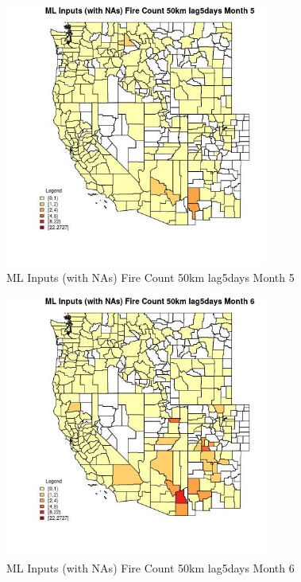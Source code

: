 \begin{figure} 
\centering  
\includegraphics[width=0.77\textwidth]{Code_Outputs/Report_ML_input_PM25_Step4_part_f_de_duplicated_aveswNAs_CountyFire_Count_50km_lag5daysmedianMonth5.jpg} 
\caption{\label{fig:Report_ML_input_PM25_Step4_part_f_de_duplicated_aveswNAsCountyFire_Count_50km_lag5daysmedianMonth5}ML Inputs (with NAs) Fire Count 50km lag5days Month 5} 
\end{figure} 
 

\begin{figure} 
\centering  
\includegraphics[width=0.77\textwidth]{Code_Outputs/Report_ML_input_PM25_Step4_part_f_de_duplicated_aveswNAs_CountyFire_Count_50km_lag5daysmedianMonth6.jpg} 
\caption{\label{fig:Report_ML_input_PM25_Step4_part_f_de_duplicated_aveswNAsCountyFire_Count_50km_lag5daysmedianMonth6}ML Inputs (with NAs) Fire Count 50km lag5days Month 6} 
\end{figure} 
 

